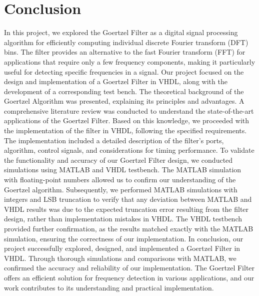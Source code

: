 \section{Conclusion}

In this project, we explored the Goertzel Filter as a digital signal processing algorithm for efficiently computing individual discrete Fourier transform (DFT) bins. The filter provides an alternative to the fast Fourier transform (FFT) for applications that require only a few frequency components, making it particularly useful for detecting specific frequencies in a signal. Our project focused on the design and implementation of a Goertzel Filter in VHDL, along with the development of a corresponding test bench.
The theoretical background of the Goertzel Algorithm was presented, explaining its principles and advantages. A comprehensive literature review was conducted to understand the state-of-the-art applications of the Goertzel Filter. Based on this knowledge, we proceeded with the implementation of the filter in VHDL, following the specified requirements. The implementation included a detailed description of the filter's ports, algorithm, control signals, and considerations for timing performance.
To validate the functionality and accuracy of our Goertzel Filter design, we conducted simulations using MATLAB and VHDL testbench. The MATLAB simulation with floating-point numbers allowed us to confirm our understanding of the Goertzel algorithm. Subsequently, we performed MATLAB simulations with integers and LSB truncation to verify that any deviation between MATLAB and VHDL results was due to the expected truncation error resulting from the filter design, rather than implementation mistakes in VHDL. The VHDL testbench provided further confirmation, as the results matched exactly with the MATLAB simulation, ensuring the correctness of our implementation.
In conclusion, our project successfully explored, designed, and implemented a Goertzel Filter in VHDL. Through thorough simulations and comparisons with MATLAB, we confirmed the accuracy and reliability of our implementation. The Goertzel Filter offers an efficient solution for frequency detection in various applications, and our work contributes to its understanding and practical implementation.